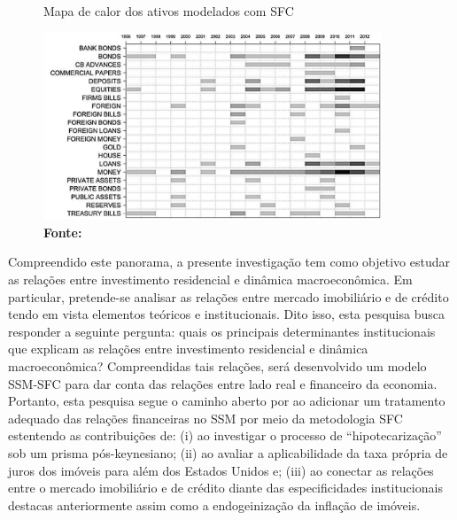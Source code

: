 \begin{figure}[htb]
	\centering
	\caption{Mapa de calor dos ativos modelados com SFC}
	\label{Heatmap}
	\includegraphics[width = 0.9\textwidth]{../../Escrita_Dissertacao/Da_Silveira_Dissertacao_Atual/Modelo/Caverzassi_Heatmap.png}
	\caption*{\textbf{Fonte:} \textcite[p.~4]{caverzasi_stock-flow_2013}}
\end{figure}




Compreendido este panorama, a presente investigação tem como objetivo estudar as relações entre investimento residencial e dinâmica macroeconômica. Em particular, pretende-se analisar as relações entre mercado imobiliário e de crédito tendo em vista elementos teóricos e institucionais. Dito isso, esta pesquisa busca responder a seguinte pergunta: quais os principais determinantes institucionais que explicam as relações entre investimento residencial e dinâmica macroeconômica? 
Compreendidas tais relações, será desenvolvido um modelo SSM-SFC para dar conta das relações entre lado real e financeiro da economia.
Portanto, esta pesquisa segue o caminho aberto por \textcite{brochier_supermultiplier_2018} ao adicionar um tratamento adequado das relações financeiras no SSM por meio da metodologia SFC estentendo as contribuições de: 
(i) \textcite{jorda_great_2014} ao investigar o processo de ``hipotecarização'' sob um prisma pós-keynesiano; 
(ii) \textcite{teixeira_crescimento_2015} ao avaliar a aplicabilidade da taxa própria de juros dos imóveis para além dos Estados Unidos e;
(iii) \textcite{da_silveira_investimento_2019} ao conectar as relações entre o mercado imobiliário e de crédito diante das especificidades institucionais destacas anteriormente assim como a endogeinização da inflação de imóveis. 